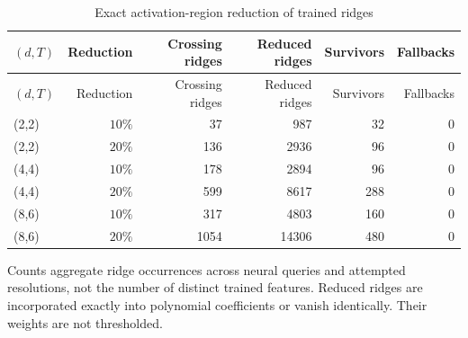 \begingroup\footnotesize\setlength{\tabcolsep}{3pt}
\begin{longtable}{lrrrrr}
\caption{Exact activation-region reduction of trained ridges}\label{tab:reduction59}\\
\hline
$(d,T)$ & Reduction & Crossing ridges & Reduced ridges & Survivors & Fallbacks \\
\hline
\endfirsthead
$(d,T)$ & Reduction & Crossing ridges & Reduced ridges & Survivors & Fallbacks \\
\hline
\endhead
(2,2) & $10\%$ & 37 & 987 & 32 & 0 \\
(2,2) & $20\%$ & 136 & 2936 & 96 & 0 \\
(4,4) & $10\%$ & 178 & 2894 & 96 & 0 \\
(4,4) & $20\%$ & 599 & 8617 & 288 & 0 \\
(8,6) & $10\%$ & 317 & 4803 & 160 & 0 \\
(8,6) & $20\%$ & 1054 & 14306 & 480 & 0 \\
\hline\end{longtable}
\noindent Counts aggregate ridge occurrences across neural queries and attempted resolutions, not the number of distinct trained features. Reduced ridges are incorporated exactly into polynomial coefficients or vanish identically. Their weights are not thresholded.
\endgroup
